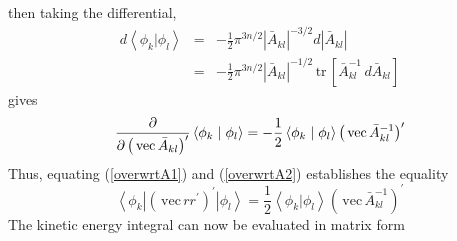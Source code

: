 \documentclass[12pt,thmsa,suthesis,verbatim]{report}
\begin{document}
then taking the differential, 
\begin{eqnarray}
d\left\langle \phi _k\right. |\left. \phi _l\right\rangle &=&-\frac 12\pi
^{3n/2}\left| \bar A_{kl}\right| ^{-3/2}d\left| \bar A_{kl}\right|  \nonumber
\\
\ &=&-\frac 12\pi ^{3n/2}\left| \bar A_{kl}\right| ^{-1/2}\,\mathrm{tr}%
\,\left[ \bar A_{kl}^{-1}\,d\bar A_{kl}\right]
\end{eqnarray}
gives 
\begin{equation}
\frac \partial {\partial \left( \,\mathrm{vec}\,\bar A_{kl}\right) ^{\prime
}}\left\langle \phi _k\right. |\left. \phi _l\right\rangle =-\frac
12\left\langle \phi _k\right. |\left. \phi _l\right\rangle \left( \,\mathrm{%
vec}\,\bar A_{kl}^{-1}\right) ^{\prime }  \label{overwrtA2}
\end{equation}
Thus, equating (\ref{overwrtA1}) and (\ref{overwrtA2}) establishes the
equality 
\begin{equation}
\left\langle \phi _k\right| \left( \,\mathrm{vec}\,rr^{\prime }\right)
^{\prime }\left| \phi _l\right\rangle =\frac 12\left\langle \phi _k\right.
|\left. \phi _l\right\rangle \left( \,\mathrm{vec}\,\bar A_{kl}^{-1}\right)
^{\prime }
\end{equation}
The kinetic energy integral can now be evaluated in matrix form 
\end{document}
